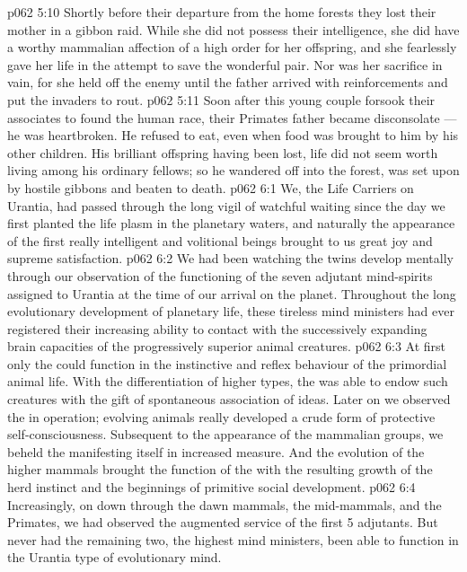 \vs p062 5:10 Shortly before their departure from the home forests they lost their mother in a gibbon raid. While she did not possess their intelligence, she did have a worthy mammalian affection of a high order for her offspring, and she fearlessly gave her life in the attempt to save the wonderful pair. Nor was her sacrifice in vain, for she held off the enemy until the father arrived with reinforcements and put the invaders to rout.
\vs p062 5:11 Soon after this young couple forsook their associates to found the human race, their Primates father became disconsolate --- he was heartbroken. He refused to eat, even when food was brought to him by his other children. His brilliant offspring having been lost, life did not seem worth living among his ordinary fellows; so he wandered off into the forest, was set upon by hostile gibbons and beaten to death.
\vs p062 6:1 We, the Life Carriers on Urantia, had passed through the long vigil of watchful waiting since the day we first planted the life plasm in the planetary waters, and naturally the appearance of the first really intelligent and volitional beings brought to us great joy and supreme satisfaction.
\vs p062 6:2 We had been watching the twins develop mentally through our observation of the functioning of the seven adjutant mind\hyp{}spirits assigned to Urantia at the time of our arrival on the planet. Throughout the long evolutionary development of planetary life, these tireless mind ministers had ever registered their increasing ability to contact with the successively expanding brain capacities of the progressively superior animal creatures.
\vs p062 6:3 At first only the  could function in the instinctive and reflex behaviour of the primordial animal life. With the differentiation of higher types, the  was able to endow such creatures with the gift of spontaneous association of ideas. Later on we observed the  in operation; evolving animals really developed a crude form of protective self\hyp{}consciousness. Subsequent to the appearance of the mammalian groups, we beheld the  manifesting itself in increased measure. And the evolution of the higher mammals brought the function of the  with the resulting growth of the herd instinct and the beginnings of primitive social development.
\vs p062 6:4 Increasingly, on down through the dawn mammals, the mid\hyp{}mammals, and the Primates, we had observed the augmented service of the first 5 adjutants. But never had the remaining two, the highest mind ministers, been able to function in the Urantia type of evolutionary mind.
